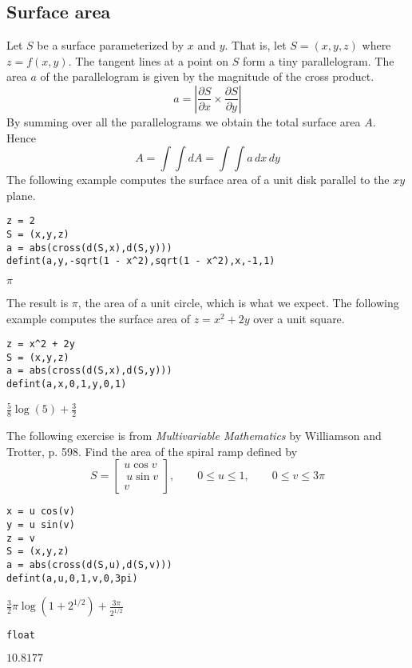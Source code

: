 
\subsection{Surface area}
Let $S$ be a surface parameterized by $x$ and $y$.
That is, let $S=(x,y,z)$ where $z=f(x,y)$.
The tangent lines at a point on $S$ form a tiny parallelogram.
The area $a$ of the parallelogram is given by the magnitude of the cross product.
$$a=\left|\frac{\partial S}{\partial x}\times\frac{\partial S}{\partial y}\right|$$
By summing over all the parallelograms we obtain the total surface area $A$.
Hence
$$A=\int\!\!\!\int dA=\int\!\!\!\int a\,dx\,dy$$
The following example computes the surface area of a unit disk
parallel to the $xy$ plane.

\begin{Verbatim}[formatcom=\color{blue},samepage=true]
z = 2
S = (x,y,z)
a = abs(cross(d(S,x),d(S,y)))
defint(a,y,-sqrt(1 - x^2),sqrt(1 - x^2),x,-1,1)
\end{Verbatim}

\noindent
$\displaystyle \pi$

\bigskip
\noindent
The result is $\pi$, the area of a unit circle, which is what we expect.
The following example computes the surface area of $z=x^2+2y$ over
a unit square.

\begin{Verbatim}[formatcom=\color{blue},samepage=true]
z = x^2 + 2y
S = (x,y,z)
a = abs(cross(d(S,x),d(S,y)))
defint(a,x,0,1,y,0,1)
\end{Verbatim}

\noindent
$\displaystyle \tfrac{5}{8}\log(5)+\tfrac{3}{2}$

\bigskip
\noindent
The following exercise is from
{\it Multivariable Mathematics} by Williamson and Trotter, p. 598.
Find the area of the spiral ramp defined by
$$S=\begin{bmatrix}u\cos v\\\ u\sin v\\ v\end{bmatrix},\qquad 0\le u\le1,\qquad 0\le v\le3\pi$$

\begin{Verbatim}[formatcom=\color{blue},samepage=true]
x = u cos(v)
y = u sin(v)
z = v
S = (x,y,z)
a = abs(cross(d(S,u),d(S,v)))
defint(a,u,0,1,v,0,3pi)
\end{Verbatim}

\noindent
$\displaystyle \tfrac{3}{2}\pi\log(1+2^{1/2})+\frac{3\pi}{2^{1/2}}$

\begin{Verbatim}[formatcom=\color{blue},samepage=true]
float
\end{Verbatim}

\noindent
$\displaystyle 10.8177$
